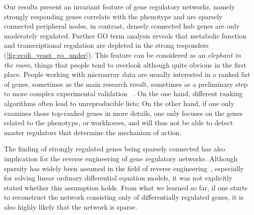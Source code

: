 Our results present an invariant feature of gene regulatory
networks, namely strongly responding genes correlate with
the phenotype and are sparsely connected peripheral nodes, 
in contrast, densely connected hub genes are only moderately
regulated. Further GO term analysis reveals that metabolic
function and transcriptional regulation are depleted in the
strong responders (\ref{fig:ecoli_yeast_go_under}).
This feature can be considered as an \emph{elephant in the room},
things that people tend to overlook although quite obvious
in the first place. People working with microarray data are
usually interested in a ranked list of genes, sometimes as the 
main research result, sometimes as a
preliminary step to more complex experimental validation~%
\citep{Boulesteix2009,Smyth2004}. On the one hand, different ranking
algorithms often lead to unreproducible lists; On the other
hand, if one only examines those top-ranked genes in more
details, one only focuses on the genes related to the phenotype,
or workhorses, and will thus not be able to detect master regulators
that determine the mechanism of action.

The finding of strongly regulated genes being sparsely connected
has also implication for the reverse engineering of gene regulatory
networks. Although sparsity has widely been assumed in the field
of reverse engineering~\citep{Yeung2002,Gardner2003}, especially
for solving linear ordinary differential equation models, it was
not explicitly stated whether this assumption holds. From what
we learned so far, if one starts to reconstruct the network consisting only of
differentially regulated genes, it is also highly likely that
the network is sparse.

